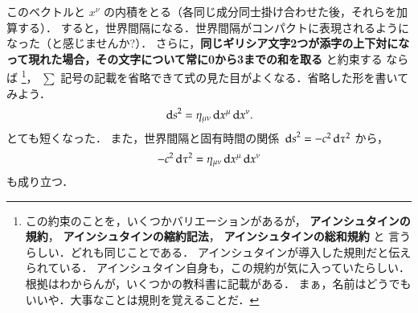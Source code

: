     このベクトルと $x^{\nu}$ の内積をとる（各同じ成分同士掛け合わせた後，それらを加算する）．
    すると，世界間隔になる．世界間隔がコンパクトに表現されるようになった（と感じませんか?）．
    さらに，\textbf{同じギリシア文字2つが添字の上下対になって現れた場合，その文字について常に0から3までの和を取る} と約束する
    ならば
        \footnote{
            この約束のことを，いくつかバリエーションがあるが，
            \textbf{アインシュタインの規約}，
            \textbf{アインシュタインの縮約記法}，
            \textbf{アインシュタインの総和規約} と
            言うらしい．どれも同じことである．
            アインシュタインが導入した規則だと伝えられている．
            アインシュタイン自身も，この規約が気に入っていたらしい．
            根拠はわからんが，いくつかの教科書に記載がある．
            まぁ，名前はどうでもいいや．大事なことは規則を覚えることだ．
        }，
    $\sum$ 記号の記載を省略できて式の見た目がよくなる．省略した形を書いてみよう．
    \begin{align}
        {\,\mathrm{d}s}^{2} = \eta_{\mu\nu} \,\mathrm{d} x^{\mu} \,\mathrm{d} x^{\nu}.
    \end{align}
    とても短くなった．
    また，世界間隔と固有時間の関係 ${\,\mathrm{d} s}^{2} = -c^{2} \,\mathrm{d} \tau^{2}$ から，
    \[
        -c^{2} \,\mathrm{d} \tau^{2} = \eta_{\mu\nu} \,\mathrm{d} x^{\mu} \,\mathrm{d} x^{\nu}
    \]
    も成り立つ．


